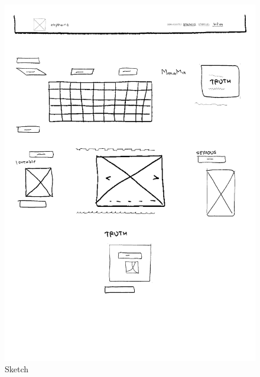 \begin{figure}[H]
\begin{minipage}{0.35\textwidth}
        \includegraphics[width=\linewidth]{images/sample2-sketch.png}
        \caption{Sketch}
        \label{fig:s22}
    \end{minipage}
\end{figure}
\vspace{1em} 
    \pagebreak
